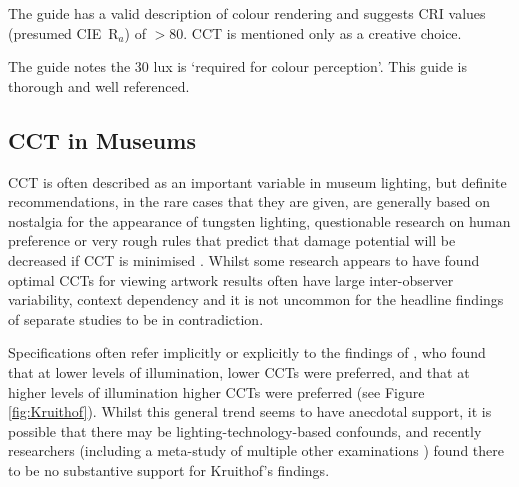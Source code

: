 The guide has a valid description of colour rendering and suggests CRI values (presumed \gls{CIE}~R$_a$) of $>80$. \gls{CCT} is mentioned only as a creative choice.

The guide notes the 30 lux is `required for colour perception'. This guide is thorough and well referenced.





















\subsection{CCT in Museums}
\label{sec:CCTmus}

\Gls{CCT} is often described as an important variable in museum lighting, but definite recommendations, in the rare cases that they are given, are generally based on nostalgia for the appearance of tungsten lighting, questionable research on human preference \citep{kruithof_tubular_1941,fotios_revised_2017} or very rough rules that predict that damage potential will be decreased if \gls{CCT} is minimised \citep{cie_cie_2004}. Whilst some research appears to have found optimal \glspl{CCT} for viewing artwork \citep{nascimento_best_2014,pinto_correlated_2008,scuello_museum_2004,scuello_museum_2004-1, liu_cultural_2013,vidovszky-nemeth_introductory_2016,feltrin_impact_2019} results often have large inter-observer variability, context dependency and it is not uncommon for the headline findings of separate studies to be in contradiction. 

Specifications often refer implicitly or explicitly to the findings of \citet{kruithof_tubular_1941}, who found that at lower levels of illumination, lower \glspl{CCT} were preferred, and that at higher levels of illumination higher \glspl{CCT} were preferred (see Figure \ref{fig:Kruithof}). Whilst this general trend seems to have anecdotal support, it is possible that there may be lighting-technology-based confounds, and recently researchers \citep{vienot_kruithofs_2009} (including a meta-study of multiple other examinations \citep{fotios_revised_2017}) found there to be no substantive support for Kruithof's findings.

